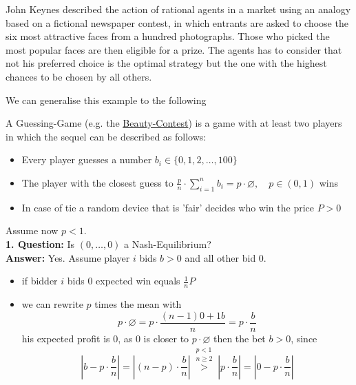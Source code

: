 \begin{example}  \label{Beauty-Contest}
John Keynes described the action of rational agents in a market using an analogy based on a fictional newspaper contest, in which entrants are asked to choose the six most attractive faces from a hundred photographs. Those who picked the most popular faces are then eligible for a prize. The agents has to consider that not his preferred choice is the optimal strategy but the one with the highest chances to be chosen by all others.
\end{example}
We can generalise this example to the following \\
\begin{example}  \label{Guessing-Game}
	 A Guessing-Game (e.g. the \hyperref[Beauty-Contest]{Beauty-Contest}) is a game with at least two players in which the sequel can be described as follows:
	\begin{itemize}
		\item Every player guesses a number $b_{i} \in \{0, 1, 2, \dotsc, 100 \}$
		\item The player with the closest guess to $\frac{p}{n} \cdot \sum_{i = 1}^{n} b_{i} = p \cdot \varnothing, \quad p \in (0, 1)$ wins
		\item In case of tie a random device that is 'fair' decides who win the price $P > 0$
	\end{itemize}
	Assume now $p < 1$. \\
	\textbf{1. Question:} Is $(0, \dotsc, 0)$ a Nash-Equilibrium? \\
	\textbf{Answer:} Yes. Assume player $i$ bids $b > 0$ and all other bid $0$.	
		\begin{itemize}
			\item if bidder $i$ bids $0$ expected win equals $\frac{1}{n} P $
			\item we can rewrite $p$ times the mean with	
				\[ p \cdot \varnothing = p \cdot \frac{(n - 1)0 + 1 b}{n} = p \cdot \frac{b}{n} \]
			his expected profit is $0$, as $0$ is closer to $p \cdot \varnothing$ then the bet $b > 0$, since
			\[ \left| b - p \cdot \frac{b}{n} \right| =  \left|(n-p) \cdot \frac{b}{n} \right| \overset{\substack{p < 1 \\ n \geq 2}}{>} \left| p \cdot \frac{b}{n} \right| = \left| 0 - p \cdot \frac{b}{n} \right| \]
		\end{itemize}
	

\end{example}
